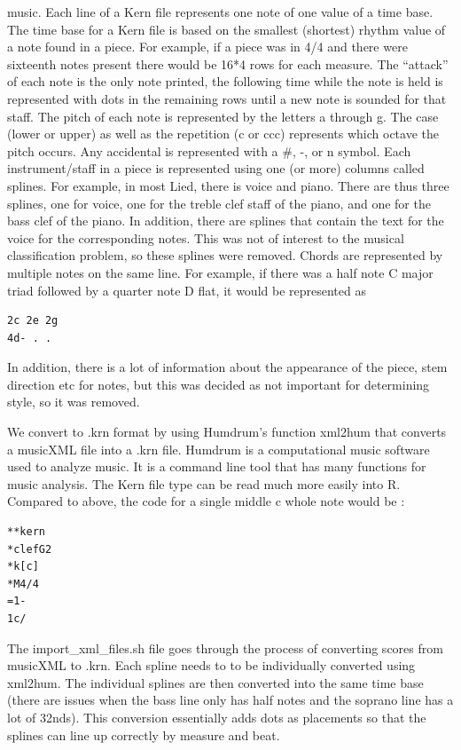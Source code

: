 \documentclass[12pt,twoside]{reedthesis}
\theoremstyle{definition}
\theoremstyle{definition}
\theoremstyle{definition}
\theoremstyle{remark}
\begin{document}
music. Each line of a Kern file represents one note of one value of a
time base. The time base for a Kern file is based on the smallest
(shortest) rhythm value of a note found in a piece. For example, if a
piece was in 4/4 and there were sixteenth notes present there would be
16*4 rows for each measure. The ``attack'' of each note is the only note
printed, the following time while the note is held is represented with
dots in the remaining rows until a new note is sounded for that staff.
The pitch of each note is represented by the letters a through g. The
case (lower or upper) as well as the repetition (c or ccc) represents
which octave the pitch occurs. Any accidental is represented with a \#,
-, or n symbol. Each instrument/staff in a piece is represented using
one (or more) columns called splines. For example, in most Lied, there
is voice and piano. There are thus three splines, one for voice, one for
the treble clef staff of the piano, and one for the bass clef of the
piano. In addition, there are splines that contain the text for the
voice for the corresponding notes. This was not of interest to the
musical classification problem, so these splines were removed. Chords
are represented by multiple notes on the same line. For example, if
there was a half note C major triad followed by a quarter note D flat,
it would be represented as
\begin{verbatim}
2c 2e 2g
4d- . . 
\end{verbatim}
In addition, there is a lot of information about the appearance of the
piece, stem direction etc for notes, but this was decided as not
important for determining style, so it was removed.

We convert to .krn format by using Humdrum's function xml2hum that
converts a musicXML file into a .krn file. Humdrum is a computational
music software used to analyze music. It is a command line tool that has
many functions for music analysis. The Kern file type can be read much
more easily into R. Compared to above, the code for a single middle c
whole note would be :
\begin{verbatim}
**kern
*clefG2
*k[c]
*M4/4
=1-
1c/
\end{verbatim}
The import\_xml\_files.sh file goes through the process of converting
scores from musicXML to .krn. Each spline needs to to be individually
converted using xml2hum. The individual splines are then converted into
the same time base (there are issues when the bass line only has half
notes and the soprano line has a lot of 32nds). This conversion
essentially adds dots as placements so that the splines can line up
correctly by measure and beat.
\end{document}
